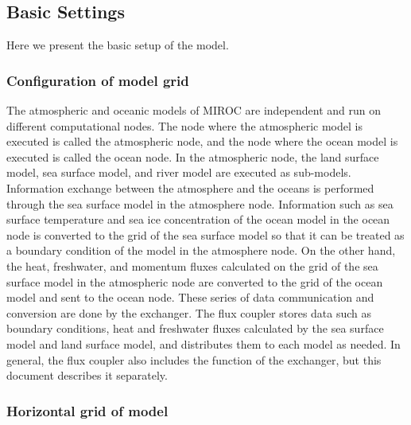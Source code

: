 \hypertarget{basic-settings}{%
\subsection{Basic Settings}\label{basic-settings}}

Here we present the basic setup of the model.

\hypertarget{configuration-of-model-grid}{%
\subsubsection{Configuration of model
grid}\label{configuration-of-model-grid}}

The atmospheric and oceanic models of MIROC are independent and run on
different computational nodes. The node where the atmospheric model is
executed is called the atmospheric node, and the node where the ocean
model is executed is called the ocean node. In the atmospheric node, the
land surface model, sea surface model, and river model are executed as
sub-models. Information exchange between the atmosphere and the oceans
is performed through the sea surface model in the atmosphere node.
Information such as sea surface temperature and sea ice concentration of
the ocean model in the ocean node is converted to the grid of the sea
surface model so that it can be treated as a boundary condition of the
model in the atmosphere node. On the other hand, the heat, freshwater,
and momentum fluxes calculated on the grid of the sea surface model in
the atmospheric node are converted to the grid of the ocean model and
sent to the ocean node. These series of data communication and
conversion are done by the exchanger. The flux coupler stores data such
as boundary conditions, heat and freshwater fluxes calculated by the sea
surface model and land surface model, and distributes them to each model
as needed. In general, the flux coupler also includes the function of
the exchanger, but this document describes it separately.

\hypertarget{horizontal-grid-of-model}{%
\subsubsection{Horizontal grid of model}\label{horizontal-grid-of-model}}

